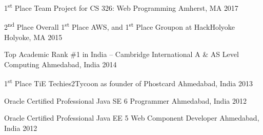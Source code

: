 



\begin{cvhonors}

  \cvhonor
    {1\textsuperscript{st} Place} %
    {Team Project for CS 326: Web Programming} %
    {Amherst, MA} %
    {2017} %

  \cvhonor
    {2\textsuperscript{nd} Place Overall} %
    {1\textsuperscript{st} Place AWS, and 1\textsuperscript{st} Place Groupon at HackHolyoke} %
    {Holyoke, MA} %
    {2015} %

  \cvhonor
    {Top Academic Rank} %
    {\#1 in India – Cambridge International A \& AS Level Computing} %
    {Ahmedabad, India} %
    {2014} %

  \cvhonor
    {1\textsuperscript{st} Place} %
    {TiE Techies2Tycoon as founder of Phostcard} %
    {Ahmedabad, India} %
    {2013} %

\end{cvhonors}




\begin{cvhonors}

  \cvhonor
    {Oracle Certified Professional} %
    {Java SE 6 Programmer} %
    {Ahmedabad, India} %
    {2012} %

  \cvhonor
    {Oracle Certified Professional} %
    {Java EE 5 Web Component Developer} %
    {Ahmedabad, India} %
    {2012} %

\end{cvhonors}
